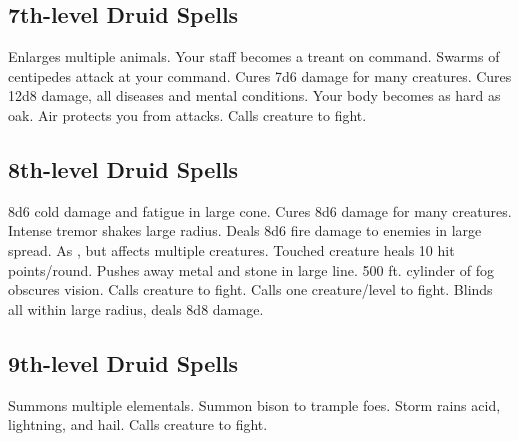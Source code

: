 \subsection{7th-level Druid Spells}
\begin{spelllist}
   Enlarges multiple animals.
   Your staff becomes a treant on command.
   Swarms of centipedes attack at your command.
   Cures 7d6 damage for many creatures.
   Cures 12d8 damage, all diseases and mental conditions.
   Your body becomes as hard as oak. 
   Air protects you from attacks. 
   Calls creature to fight.
\end{spelllist}

\subsection{8th-level Druid Spells}
\begin{spelllist}
   8d6 cold damage and fatigue in large cone.
   Cures 8d6 damage for many creatures.
   Intense tremor shakes large radius.
   Deals 8d6 fire damage to enemies in large spread.
   As , but affects multiple creatures.
   Touched creature heals 10 hit points/round.
   Pushes away metal and stone in large line.
   500 ft. cylinder of fog obscures vision.
   Calls creature to fight.
   Calls one creature/level to fight.
   Blinds all within large radius, deals 8d8 damage.
\end{spelllist}

\subsection{9th-level Druid Spells}
\begin{spelllist}
   Summons multiple elementals.
   Summon bison to trample foes.
   Storm rains acid, lightning, and hail.
   Calls creature to fight.
\end{spelllist}

